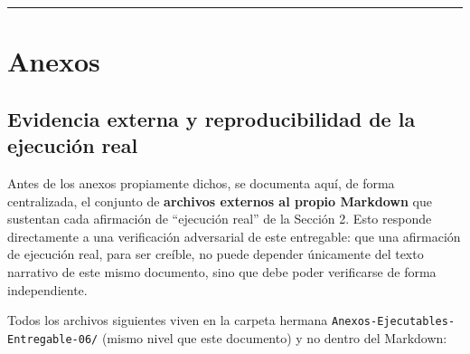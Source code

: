 \documentclass[11pt,a4paper]{article}
\begin{document}
\begin{center}\rule{0.5\linewidth}{0.5pt}\end{center}

\section{Anexos}\label{anexos}

\subsection{Evidencia externa y reproducibilidad de la ejecución real}\label{evidencia-externa-y-reproducibilidad-de-la-ejecuciuxf3n-real}

Antes de los anexos propiamente dichos, se documenta aquí, de forma centralizada, el conjunto de \textbf{archivos externos al propio Markdown} que sustentan cada afirmación de ``ejecución real'' de la Sección 2. Esto responde directamente a una verificación adversarial de este entregable: que una afirmación de ejecución real, para ser creíble, no puede depender únicamente del texto narrativo de este mismo documento, sino que debe poder verificarse de forma independiente.

Todos los archivos siguientes viven en la carpeta hermana \texttt{Anexos-Ejecutables-Entregable-06/} (mismo nivel que este documento) y no dentro del Markdown:
\end{document}
